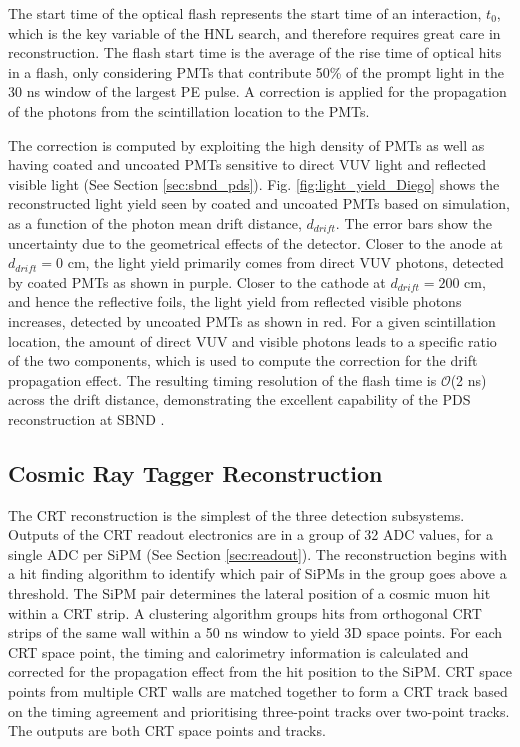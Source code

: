 The start time of the optical flash represents the start time of an interaction, $t_0$, which is the key variable of the HNL search, and therefore requires great care in reconstruction.
The flash start time is the average of the rise time of optical hits in a flash, only considering PMTs that contribute 50\% of the prompt light in the 30 ns window of the largest PE pulse.
A correction is applied for the propagation of the photons from the scintillation location to the PMTs.

The correction is computed by exploiting the high density of PMTs as well as having coated and uncoated PMTs sensitive to direct VUV light and reflected visible light (See Section \ref{sec:sbnd_pds}).
Fig. \ref{fig:light_yield_Diego} shows the reconstructed light yield seen by coated and uncoated PMTs based on simulation, as a function of the photon mean drift distance, $d_{drift}$.
The error bars show the uncertainty due to the geometrical effects of the detector.
Closer to the anode at $d_{drift} = 0 $ cm, the light yield primarily comes from direct VUV photons, detected by coated PMTs as shown in purple.
Closer to the cathode at $d_{drift} = 200 $ cm, and hence the reflective foils, the light yield from reflected visible photons increases, detected by uncoated PMTs as shown in red.
For a given scintillation location, the amount of direct VUV and visible photons leads to a specific ratio of the two components, which is used to compute the correction for the drift propagation effect.                                                                              
The resulting timing resolution of the flash time is $\mathcal{O}$(2 ns) across the drift distance, demonstrating the excellent capability of the PDS reconstruction at SBND \cite{sbnd_pds_paper}.

\subsection{Cosmic Ray Tagger Reconstruction}
\label{sec:crt_reco}

The CRT reconstruction is the simplest of the three detection subsystems.
Outputs of the CRT readout electronics are in a group of 32 ADC values, for a single ADC per SiPM (See Section \ref{sec:readout}).
The reconstruction begins with a hit finding algorithm to identify which pair of SiPMs in the group goes above a threshold.
The SiPM pair determines the lateral position of a cosmic muon hit within a CRT strip.
A clustering algorithm groups hits from orthogonal CRT strips of the same wall within a 50 ns window to yield 3D space points.
For each CRT space point, the timing and calorimetry information is calculated and corrected for the propagation effect from the hit position to the SiPM.
CRT space points from multiple CRT walls are matched together to form a CRT track based on the timing agreement and prioritising three-point tracks over two-point tracks.
The outputs are both CRT space points and tracks. 

